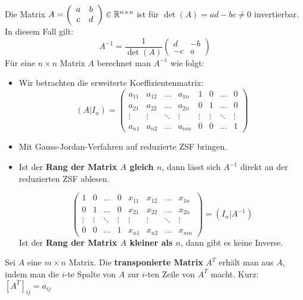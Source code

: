 Die Matrix $A = \left(
\begin{array}{cc}
    a & b \\ c & d
\end{array} \right) \in \mathbb{R}^{n \times n}$ ist für $\det(A) = ad - bc \neq 0$ invertierbar.
In diesem Fall gilt:
\[A^{-1} = \frac{1}{\det(A)} \left(
\begin{array}{cc}
    d & -b \\ -c & a
\end{array}
\right)\]
Für eine $n \times n$ Matrix $A$ berechnet man $A^{-1}$ wie folgt:
\begin{itemize}
    \item Wir betrachten die erweiterte Koeffizientenmatrix:
    \[(A | I_n) = \left(
    \begin{array}{cccc|cccc}
        a_{11} & a_{12} & \ldots & a_{1n} & 1      & 0      & \ldots & 0      \\
        a_{21} & a_{22} & \ldots & a_{2n} & 0      & 1      & \ldots & 0      \\
        \vdots & \vdots & \ddots & \vdots & \vdots & \vdots & \ddots & \vdots \\
        a_{n1} & a_{n2} & \ldots & a_{nm} & 0      & 0      & \ldots & 1
    \end{array}
    \right)\]
    \item Mit Gauss-Jordan-Verfahren auf reduzierte ZSF bringen.
    \item Ist der \textbf{Rang der Matrix $A$ gleich $n$}, dann lässt sich $A^{-1}$ direkt an der reduzierten ZSF ablesen.

    \[\left(
    \begin{array}{cccc|cccc}
        1      & 0      & \ldots & 0      & x_{11} & x_{12} & \ldots & x_{1n} \\
        0      & 1      & \ldots & 0      & x_{21} & x_{22} & \ldots & x_{2n} \\
        \vdots & \vdots & \ddots & \vdots & \vdots & \vdots & \ddots & \vdots \\
        0      & 0      & \ldots & 1      & x_{n1} & x_{n2} & \ldots & x_{nm}
    \end{array}
    \right) = (I_n | A^{-1})\]
    Ist der \textbf{Rang der Matrix $A$ kleiner als $n$}, dann gibt es keine Inverse.
\end{itemize}


Sei $A$ eine $m \times n$ Matrix.
Die \textbf{transponierte Matrix} $A^T$ erhält man aus $A$, indem man die $i$-te Spalte von $A$ zur $i$-ten Zeile von $A^T$ macht.
Kurz: $\left[ A^T \right]_{ij} = a_{ij}$

